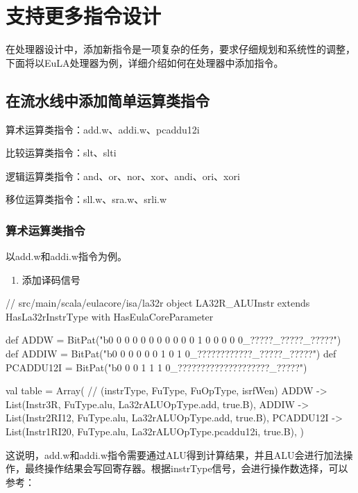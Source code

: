 
\chapter{支持更多指令设计}\label{chap:06-more-instructions}

在处理器设计中，添加新指令是一项复杂的任务，要求仔细规划和系统性的调整，下面将以EuLA处理器为例，详细介绍如何在处理器中添加指令。

\section{在流水线中添加简单运算类指令}\label{sec:06-more-instructions-001}

算术运算类指令：add.w、addi.w、pcaddu12i

比较运算类指令：slt、slti

逻辑运算类指令：and、or、nor、xor、andi、ori、xori

移位运算类指令：sll.w、sra.w、srli.w

\subsection{算术运算类指令}\label{sec:06-more-instructions-002}

以add.w和addi.w指令为例。

\begin{enumerate}
\def\labelenumi{\arabic{enumi}.}
\tightlist
\item
  添加译码信号
\end{enumerate}

\begin{CodeBlock}[language=BookScala]
// src/main/scala/eulacore/isa/la32r
object LA32R_ALUInstr extends HasLa32rInstrType with HasEulaCoreParameter {
  def ADDW    = BitPat("b0 0 0 0 0 0 0 0 0 0 0 1 0 0 0 0 0_?????_?????_?????")
  def ADDIW   = BitPat("b0 0 0 0 0 0 1 0 1 0_????????????_?????_?????")
  def PCADDU12I = BitPat("b0 0 0 1 1 1 0_????????????????????_?????")

  val table = Array( // (instrType, FuType, FuOpType, isrfWen)
    ADDW        -> List(Instr3R, FuType.alu, La32rALUOpType.add, true.B),
    ADDIW       -> List(Instr2RI12, FuType.alu, La32rALUOpType.add, true.B),
    PCADDU12I   -> List(Instr1RI20, FuType.alu, La32rALUOpType.pcaddu12i, true.B),
  )
}
\end{CodeBlock}

这说明，add.w和addi.w指令需要通过ALU得到计算结果，并且ALU会进行加法操作，最终操作结果会写回寄存器。根据instrType信号，会进行操作数选择，可以参考：

